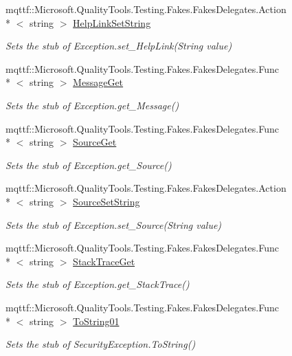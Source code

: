 \begin{DoxyCompactItemize}
mqttf\-::\-Microsoft.\-Quality\-Tools.\-Testing.\-Fakes.\-Fakes\-Delegates.\-Action\\*
$<$ string $>$ \hyperlink{class_system_1_1_security_1_1_fakes_1_1_stub_security_exception_a24169793414704cc84979053557907cb}{Help\-Link\-Set\-String}
\begin{DoxyCompactList}\small\item\em Sets the stub of Exception.\-set\-\_\-\-Help\-Link(\-String value)\end{DoxyCompactList}\item 
mqttf\-::\-Microsoft.\-Quality\-Tools.\-Testing.\-Fakes.\-Fakes\-Delegates.\-Func\\*
$<$ string $>$ \hyperlink{class_system_1_1_security_1_1_fakes_1_1_stub_security_exception_ab35bf73d6c6b51260edaa3e8e3391b3a}{Message\-Get}
\begin{DoxyCompactList}\small\item\em Sets the stub of Exception.\-get\-\_\-\-Message()\end{DoxyCompactList}\item 
mqttf\-::\-Microsoft.\-Quality\-Tools.\-Testing.\-Fakes.\-Fakes\-Delegates.\-Func\\*
$<$ string $>$ \hyperlink{class_system_1_1_security_1_1_fakes_1_1_stub_security_exception_af450f2f907b181927fa6e557a7434961}{Source\-Get}
\begin{DoxyCompactList}\small\item\em Sets the stub of Exception.\-get\-\_\-\-Source()\end{DoxyCompactList}\item 
mqttf\-::\-Microsoft.\-Quality\-Tools.\-Testing.\-Fakes.\-Fakes\-Delegates.\-Action\\*
$<$ string $>$ \hyperlink{class_system_1_1_security_1_1_fakes_1_1_stub_security_exception_a62cb50dce0a6868e7fcac82247f71177}{Source\-Set\-String}
\begin{DoxyCompactList}\small\item\em Sets the stub of Exception.\-set\-\_\-\-Source(\-String value)\end{DoxyCompactList}\item 
mqttf\-::\-Microsoft.\-Quality\-Tools.\-Testing.\-Fakes.\-Fakes\-Delegates.\-Func\\*
$<$ string $>$ \hyperlink{class_system_1_1_security_1_1_fakes_1_1_stub_security_exception_ad8127036028763b5918d5c54f27e218c}{Stack\-Trace\-Get}
\begin{DoxyCompactList}\small\item\em Sets the stub of Exception.\-get\-\_\-\-Stack\-Trace()\end{DoxyCompactList}\item 
mqttf\-::\-Microsoft.\-Quality\-Tools.\-Testing.\-Fakes.\-Fakes\-Delegates.\-Func\\*
$<$ string $>$ \hyperlink{class_system_1_1_security_1_1_fakes_1_1_stub_security_exception_a0b24eb9a81d470f82893d781ef800ebe}{To\-String01}
\begin{DoxyCompactList}\small\item\em Sets the stub of Security\-Exception.\-To\-String()\end{DoxyCompactList}\end{DoxyCompactItemize}

